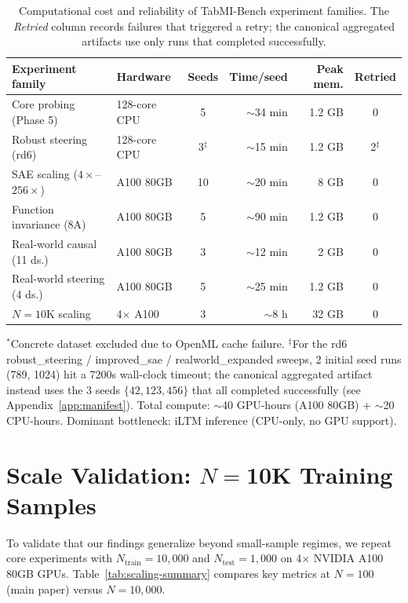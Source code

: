 \documentclass{article}
\begin{document}
\begin{table}[htbp]
\centering
\caption{Computational cost and reliability of TabMI-Bench experiment families. The \emph{Retried} column records failures that triggered a retry; the canonical aggregated artifacts use only runs that completed successfully.}
\label{tab:compute}
\footnotesize
\setlength{\tabcolsep}{4pt}
\begin{tabular}{@{}p{3.6cm} p{2.4cm} c r r c@{}}
\toprule
Experiment family & Hardware & Seeds & Time/seed & Peak mem. & Retried \\
\midrule
Core probing (Phase 5) & 128-core CPU & 5 & $\sim$34 min & 1.2 GB & 0 \\
Robust steering (rd6) & 128-core CPU & 3$^{\ddagger}$ & $\sim$15 min & 1.2 GB & 2$^{\ddagger}$ \\
SAE scaling ($4\times$--$256\times$) & A100 80GB & 10 & $\sim$20 min & 8 GB & 0 \\
Function invariance (8A) & A100 80GB & 5 & $\sim$90 min & 1.2 GB & 0 \\
Real-world causal (11 ds.) & A100 80GB & 3 & $\sim$12 min & 2 GB & 0 \\
Real-world steering (4 ds.) & A100 80GB & 5 & $\sim$25 min & 1.2 GB & 0 \\
$N{=}10$K scaling & 4$\times$ A100 & 3 & $\sim$8 h & 32 GB & 0 \\
\bottomrule
\end{tabular}
\end{table}

$^{*}$Concrete dataset excluded due to OpenML cache failure. $^{\ddagger}$For the rd6 robust\_steering / improved\_sae / realworld\_expanded sweeps, 2 initial seed runs (789, 1024) hit a 7200s wall-clock timeout; the canonical aggregated artifact instead uses the 3 seeds $\{42, 123, 456\}$ that all completed successfully (see Appendix~\ref{app:manifest}). Total compute: $\sim$40 GPU-hours (A100 80GB) + $\sim$20 CPU-hours. Dominant bottleneck: iLTM inference (CPU-only, no GPU support).

\section{Scale Validation: \texorpdfstring{$N{=}$10K}{N=10K} Training Samples}
\label{app:scaling}

To validate that our findings generalize beyond small-sample regimes, we repeat core experiments with $N_{\text{train}}{=}10{,}000$ and $N_{\text{test}}{=}1{,}000$ on 4$\times$ NVIDIA A100 80GB GPUs. Table~\ref{tab:scaling-summary} compares key metrics at $N{=}100$ (main paper) versus $N{=}10{,}000$.
\end{document}
